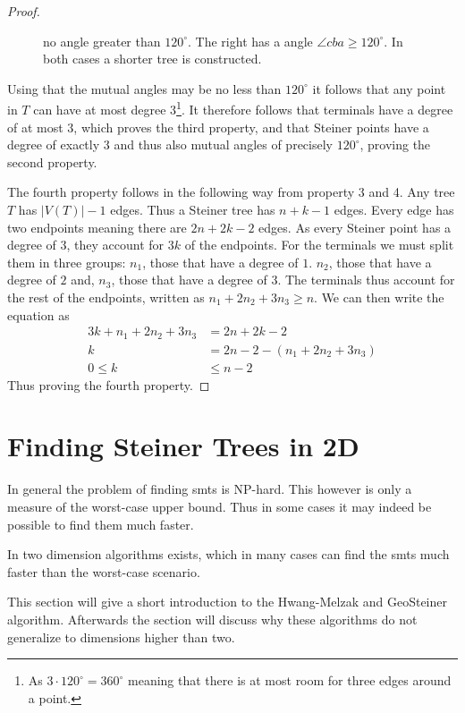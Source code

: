 \begin{proof}
{\begin{figure}[htbp]
{  no angle greater than $120^{\circ}$. The right has a angle
  $\angle cba \ge 120^{\circ}$. In both cases a shorter tree is
  constructed\footnotemark.\label{fig:preliminaries-steiner-point}}
\end{figure}
}
%
Using that the mutual angles may be no less than $120^{\circ}$ it follows that
any point in $T$ can have at most degree $3$\footnote{As
  $3 \cdot 120^{\circ} = 360^{\circ}$ meaning that there is at most room for
  three edges around a point.}. It therefore follows that terminals have a
degree of at most $3$, which proves the third property, and that Steiner points
have a degree of exactly $3$ and thus also mutual angles of precisely
$120^{\circ}$, proving the second property.

The fourth property follows in the following way from property 3 and 4. Any tree
$T$ has $|V(T)|-1$ edges. Thus a Steiner tree has $n+k-1$ edges.  Every edge has
two endpoints meaning there are $2 n + 2 k - 2$ edges. As every Steiner point
has a degree of $3$, they account for $3 k$ of the endpoints. For the terminals
we must split them in three groups: $n_1$, those that have a degree of
$1$. $n_2$, those that have a degree of $2$ and, $n_3$, those that have a degree
of $3$. The terminals thus account for the rest of the endpoints, written as
$n_1 + 2 n_2 + 3 n_3 \ge n$. We can then write the equation as
%
\begin{align}
  \label{eq:22}
  3 k + n_1 + 2 n_2 + 3 n_3 &= 2 n + 2 k - 2 \\
  k &= 2 n - 2 - (n_1 + 2 n_2 + 3 n_3) \\
  0 \le k &\le n - 2
\end{align}
%
Thus proving the fourth property.
\end{proof}

\section{Finding Steiner Trees in 2D}
\label{sec:find-stein-trees-2}

In general the problem of finding \acp{smt} is NP-hard. This however is only a
measure of the worst-case upper bound. Thus in some cases it may indeed be
possible to find them much faster.

In two dimension algorithms exists, which in many cases can find the \acp{smt} much
faster than the worst-case scenario.

This section will give a short introduction to the Hwang-Melzak and GeoSteiner
algorithm. Afterwards the section will discuss why these algorithms do not
generalize to dimensions higher than two.

